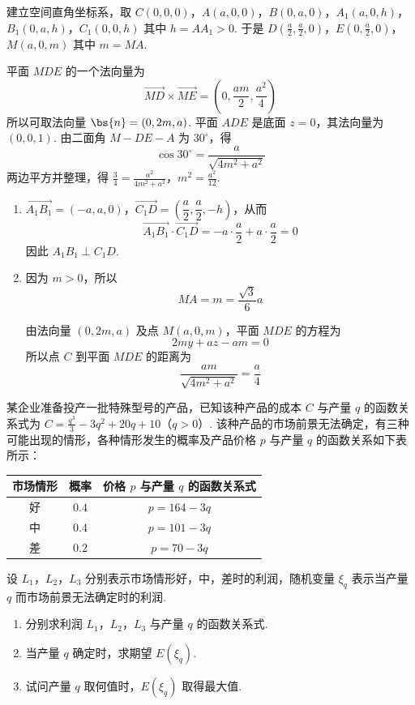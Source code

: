 \begin{solution}
建立空间直角坐标系，取
\(C(0,0,0)\)，\(A(a,0,0)\)，\(B(0,a,0)\)，\(A_{1}(a,0,h)\)，\(B_{1}(0,a,h)\)，\(C_{1}(0,0,h)\)
其中 \(h=AA_{1}>0\). 于是
\(D\left(\frac{a}{2},\frac{a}{2},0\right)\)，\(E\left(0,\frac{a}{2},0\right)\)，\(M(a,0,m)\)
其中 \(m=MA\).

平面 \(MDE\) 的一个法向量为
\[
\overrightarrow{MD}\times\overrightarrow{ME}=\left(0,\frac{am}{2},\frac{a^{2}}{4}\right)
\]
所以可取法向量 \(\bs{n}=(0,2m,a)\). 平面 \(ADE\) 是底面 \(z=0\)，其法向量为 \((0,0,1)\). 由二面角 \(M-DE-A\) 为 \(30^{\circ}\)，得
\[
\cos30^{\circ}=\frac{a}{\sqrt{4m^{2}+a^{2}}}
\]
两边平方并整理，得
\(\frac{3}{4}=\frac{a^{2}}{4m^{2}+a^{2}}\)，\(m^{2}=\frac{a^{2}}{12}\).

\begin{enumerate}
\item \(\overrightarrow{A_{1}B_{1}}=(-a,a,0)\)，\(\overrightarrow{C_{1}D}=\left(\dfrac{a}{2},\dfrac{a}{2},-h\right)\)，从而
\[
\overrightarrow{A_{1}B_{1}}\cdot\overrightarrow{C_{1}D}=-a\cdot\frac{a}{2}+a\cdot\frac{a}{2}=0
\]
因此 \(A_{1}B_{1}\perp C_{1}D\).
\item 因为 \(m>0\)，所以
\[
MA=m=\frac{\sqrt{3}}{6}a
\]

由法向量 \((0,2m,a)\) 及点 \(M(a,0,m)\)，平面 \(MDE\) 的方程为
\[
2my+az-am=0
\]
所以点 \(C\) 到平面 \(MDE\) 的距离为
\[
\frac{am}{\sqrt{4m^{2}+a^{2}}}=\frac{a}{4}
\]
\end{enumerate}
\end{solution}

\begin{problem}
某企业准备投产一批特殊型号的产品，已知该种产品的成本 \(C\) 与产量 \(q\) 的函数关系式为 \(C = \frac{q^{3}}{3} - 3q^{2} + 20q + 10\)（\(q > 0\)）. 该种产品的市场前景无法确定，有三种可能出现的情形，各种情形发生的概率及产品价格 \(p\) 与产量 \(q\) 的函数关系如下表所示：

\begin{center}\small
\begin{tabular}{|c|c|c|}
\hline
市场情形 & 概率 & 价格 \(p\) 与产量 \(q\) 的函数关系式 \\
\hline
好 & \(0.4\) & \(p = 164 - 3q\) \\
\hline
中 & \(0.4\) & \(p = 101 - 3q\) \\
\hline
差 & \(0.2\) & \(p = 70 - 3q\) \\
\hline
\end{tabular}
\end{center}

设 \(L_1\)，\(L_2\)，\(L_3\) 分别表示市场情形好，中，差时的利润，随机变量 \(\xi_q\) 表示当产量 \(q\) 而市场前景无法确定时的利润.

\begin{enumerate}
\item 分别求利润 \(L_1\)，\(L_2\)，\(L_3\) 与产量 \(q\) 的函数关系式.
\item 当产量 \(q\) 确定时，求期望 \(E(\xi_q)\).
\item 试问产量 \(q\) 取何值时，\(E(\xi_q)\) 取得最大值.
\end{enumerate}
\end{problem}

